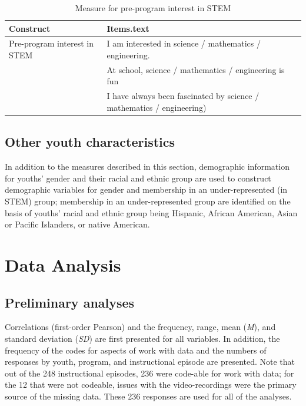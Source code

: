 \documentclass[]{msu-thesis}
\theoremstyle{definition}
\theoremstyle{definition}
\theoremstyle{definition}
\theoremstyle{remark}
\begin{document}
\begin{table}

\caption{\label{tab:unnamed-chunk-6}Measure for pre-program interest in STEM}
\centering
\begin{tabular}[t]{ll}
\toprule
Construct & Items.text\\
\midrule
Pre-program interest in STEM & I am interested in science / mathematics / engineering.\\
 & At school, science / mathematics / engineering is fun\\
 & I have always been fascinated by science / mathematics / engineering)\\
\bottomrule
\end{tabular}
\end{table}

\subsection{Other youth
characteristics}\label{other-youth-characteristics}

In addition to the measures described in this section, demographic
information for youths' gender and their racial and ethnic group are
used to construct demographic variables for gender and membership in an
under-represented (in STEM) group; membership in an under-represented
group are identified on the basis of youths' racial and ethnic group
being Hispanic, African American, Asian or Pacific Islanders, or native
American.

\section{Data Analysis}\label{data-analysis}

\subsection{Preliminary analyses}\label{preliminary-analyses}

Correlations (first-order Pearson) and the frequency, range, mean
(\emph{M}), and standard deviation (\emph{SD}) are first presented for
all variables. In addition, the frequency of the codes for aspects of
work with data and the numbers of responses by youth, program, and
instructional episode are presented. Note that out of the 248
instructional episodes, 236 were code-able for work with data; for the
12 that were not codeable, issues with the video-recordings were the
primary source of the missing data. These 236 responses are used for all
of the analyses.
\end{document}

